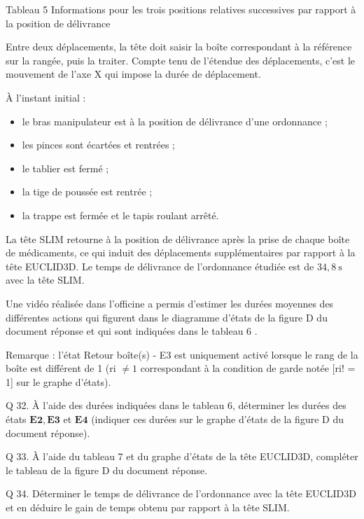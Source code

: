 \documentclass[10pt]{article}
\begin{document}
Tableau 5 Informations pour les trois positions relatives successives par rapport à la position de délivrance

Entre deux déplacements, la tête doit saisir la boîte correspondant à la référence sur la rangée, puis la traiter. Compte tenu de l'étendue des déplacements, c'est le mouvement de l'axe X qui impose la durée de déplacement.

À l'instant initial :

\begin{itemize}
  \item le bras manipulateur est à la position de délivrance d'une ordonnance ;

  \item les pinces sont écartées et rentrées ;

  \item le tablier est fermé ;

  \item la tige de poussée est rentrée ;

  \item la trappe est fermée et le tapis roulant arrêté.

\end{itemize}

La tête SLIM retourne à la position de délivrance après la prise de chaque boîte de médicaments, ce qui induit des déplacements supplémentaires par rapport à la tête EUCLID3D. Le temps de délivrance de l'ordonnance étudiée est de $34,8 \mathrm{~s}$ avec la tête SLIM.

Une vidéo réalisée dans l'officine a permis d'estimer les durées moyennes des différentes actions qui figurent dans le diagramme d'états de la figure D du document réponse et qui sont indiquées dans le tableau 6 .

Remarque : l'état Retour boîte(s) - E3 est uniquement activé lorsque le rang de la boîte est différent de 1 (ri $\neq 1$ correspondant à la condition de garde notée [ri! = 1] sur le graphe d'états).

Q 32. À l'aide des durées indiquées dans le tableau 6, déterminer les durées des états $\mathbf{E 2}, \mathbf{E 3}$ et $\mathbf{E 4}$ (indiquer ces durées sur le graphe d'états de la figure D du document réponse).

Q 33. À l'aide du tableau 7 et du graphe d'états de la tête EUCLID3D, compléter le tableau de la figure D du document réponse.

Q 34. Déterminer le temps de délivrance de l'ordonnance avec la tête EUCLID3D et en déduire le gain de temps obtenu par rapport à la tête SLIM.
\end{document}
